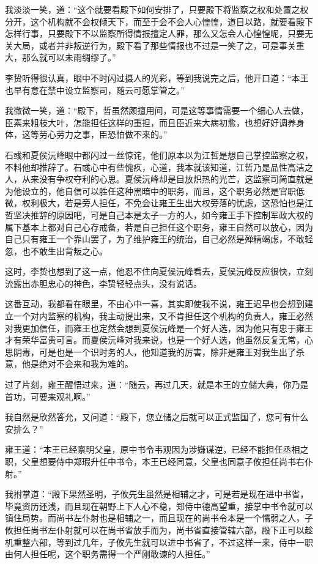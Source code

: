 我淡淡一笑，道：“这个就要看殿下如何安排了，只要殿下将监察之权和处置之权分开，这个机构就不会权倾天下，而至于会不会人心惶惶，道目以路，就要看殿下怎样行事，只要殿下不以监察所得情报擅定人罪，那么又怎会人心惶惶呢，只要无关大局，或者并非叛逆行为，殿下看了那些情报也不过是一笑了之，可是事关重大，那么就可以未雨绸缪了。”

李贽听得很认真，眼中不时闪过摄人的光彩，等到我说完之后，他开口道：“本王也早有意在禁中设立监察司，随云可愿掌管之。”

我微微一笑，道：“殿下，哲虽然颇擅用间，可是这等事情需要一个细心人去做，臣素来粗枝大叶，怎能担任这样的重担，而且臣近来大病初愈，也想好好调养身体，这等劳心劳力之事，臣恐怕做不来的。”

石彧和夏侯沅峰眼中都闪过一丝惊诧，他们原本以为江哲是想自己掌控监察之权，不料他却推辞了。石彧心中有些愧疚，心道，我本就该知道，江哲乃是品性高洁之人，从来没有争权夺利的心思。夏侯沅峰却是目放炽热的光芒，这监察司简直就是为他设立的，他自信可以胜任这种黑暗中的职务，而且，这个职务必然是官职低微，权利极大，若是旁人担任，不免会让雍王生出大权旁落的忧虑，这恐怕也是江哲坚决推辞的原因吧，可是自己本是太子一方的人，如今雍王手下控制军政大权的属下基本上都对自己心存戒备，若是自己担任这个职务，雍王自然可以放心，因为自己只有雍王一个靠山罢了，为了维护雍王的统治，自己必然是殚精竭虑，不敢轻忽，也不敢生出背叛之心。

这时，李贽也想到了这一点，他忍不住向夏侯沅峰看去，夏侯沅峰反应很快，立刻流露出赤胆忠心的神色，李贽轻轻点头，没有说话。

这番互动，我都看在眼里，不由心中一喜，其实即使我不说，雍王迟早也会想到建立一个对内监察的机构，我主动提出来，又不肯担任这个机构的负责人，雍王必然对我更加信任，而雍王也定然会想到夏侯沅峰是一个好人选，因为他只有忠于雍王才有荣华富贵可言。而夏侯沅峰对我来说，也是一个好人选，他虽然反复无常，心思阴毒，可是也是一个识时务的人，他知道我的厉害，除非是雍王对我生出了杀意，他是绝对不会来和我为难的。

过了片刻，雍王醒悟过来，道：“随云，再过几天，就是本王的立储大典，你乃是首功，可要来观礼啊。”

我自然是欣然答允，又问道：“殿下，您立储之后就可以正式监国了，您可有什么安排么？”

雍王道：“本王已经禀明父皇，原中书令韦观因为涉嫌谋逆，已经不能担任丞相之职，父皇想要侍中郑瑕升任中书令，本王已经同意，父皇也同意子攸担任尚书右仆射。”

我拊掌道：“殿下果然圣明，子攸先生虽然是相辅之才，可是若是现在进中书省，毕竟资历还浅，而且现在朝野上下人心不稳，郑侍中德高望重，接掌中书令就可以镇住局势。而尚书左仆射也是相辅之一，而且现在的尚书令本是一个懦弱之人，子攸担任尚书左仆射就可以在尚书省放手而为，尚书省直接管辖六部，殿下正可以趁机重整六部，等到过几年，子攸先生就可以进中书省了，不过这样一来，侍中一职由何人担任呢，这个职务需得一个严刚敢谏的人担任。”

